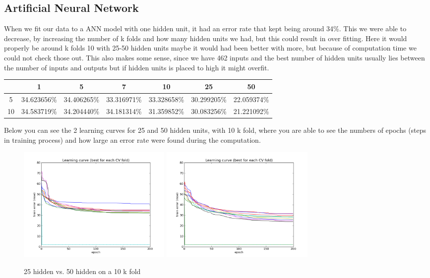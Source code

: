 \subsection{Artificial Neural Network}
When we fit our data to a ANN model with one hidden unit, it had an error rate that kept being around 34\%. This we were able to decrease, by increasing the number of k folds and how many hidden units we had, but this could result in over fitting. Here it would properly be around k folds 10 with 25-50 hidden units maybe it would had been better with more, but because of computation time we could not check those out. This also makes some sense, since we have 462 inputs and the best number of hidden units usually lies between the number of inputs and outputs but if hidden units is placed to high it might overfit.
\begin{table}[H]
\begin{longtable}{ccccccc}
\hline 
   & 1 			 & 5 		   & 7 			 & 10		   & 25			 & 50 \\ \hline
5  & 34.623656\% & 34.406265\% & 33.316971\% & 33.328658\% & 30.299205\% & 22.059374\% \\ 
10 & 34.583719\% & 34.204440\% & 34.181314\% & 31.359852\% & 30.083256\% & 21.221092\% \\ \hline 
\end{longtable}
\end{table}
Below you can see the 2 learning curves for 25 and 50 hidden units, with 10 k fold, where you are able to see the numbers of epochs (steps in training process) and how large an error rate were found during the computation.
\begin{figure}[H]
\centering
\includegraphics[width=7.5cm, keepaspectratio=true]{pictures/ann_1_10_25.png}
\includegraphics[width=7.5cm, keepaspectratio=true]{pictures/ann_1_10_50.png}
\vspace{-0.4cm}
\caption{\footnotesize 25 hidden vs. 50 hidden on a 10 k fold}
\label{full_10_25_50}
\end{figure}
